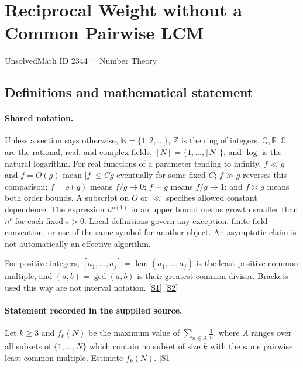 \documentclass[11pt,a4paper]{article}
\newcommand{\N}{\mathbb{N}}
\newcommand{\Z}{\mathbb{Z}}
\newcommand{\Q}{\mathbb{Q}}
\newcommand{\R}{\mathbb{R}}
\newcommand{\C}{\mathbb{C}}
\newcommand{\sref}[2]{\hyperlink{source:#1:#2}{[S#2]}}
\begin{document}

\setcounter{section}{2343}

\section{Reciprocal Weight without a Common Pairwise LCM}\label{2344}

{\small\sffamily UnsolvedMath ID 2344 · Number Theory}

\subsection{Definitions and mathematical statement}

\paragraph{Shared notation.}Unless a section says otherwise, $\N=\{1,2,\ldots\}$,
$\Z$ is the ring of integers, $\Q,\R,\C$ are the rational, real, and complex
fields, $[N]=\{1,\ldots,\lfloor N\rfloor\}$, and $\log$ is the natural
logarithm. For real functions of a parameter tending to infinity,
$f\ll g$ and $f=O(g)$ mean $|f|\leq Cg$ eventually for some fixed $C$;
$f\gg g$ reverses this comparison; $f=o(g)$ means $f/g\to0$;
$f\sim g$ means $f/g\to1$; and $f\asymp g$ means both order bounds.
A subscript on $O$ or $\ll$ specifies allowed constant dependence.
The expression $n^{o(1)}$ in an upper bound means growth smaller than
$n^\epsilon$ for each fixed $\epsilon>0$. Local definitions govern any
exception, finite-field convention, or use of the same symbol for another
object. An asymptotic claim is not automatically an effective algorithm.



For positive integers, $[a_1,\ldots,a_j]=\operatorname{lcm}(a_1,\ldots,a_j)$ is the least positive common multiple, and $(a,b)=\gcd(a,b)$ is their greatest common divisor. Brackets used this way are not interval notation. \sref{2344}{1} \sref{2344}{2}

\paragraph{Statement recorded in the supplied source.}
Let $k\geq 3$ and $f_k(N)$ be the maximum value of $\sum_{n\in A}\frac{1}{n}$, where $A$ ranges over all subsets of $\{1,\ldots,N\}$ which contain no subset of size $k$ with the same pairwise least common multiple.
Estimate $f_k(N)$. \sref{2344}{1}
\end{document}
